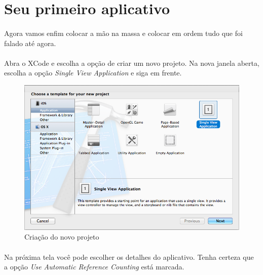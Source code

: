 \documentclass[a4paper,12pt,brazil,doubleside]{book}
\begin{document}
\bigskip
\bigskip


\section{Seu primeiro aplicativo}

\paragraph{}Agora vamos enfim colocar a mão na massa e colocar em ordem tudo que foi falado até agora.
\paragraph{}Abra o XCode e escolha a opção de criar um novo projeto. Na nova janela aberta, escolha a opção \emph{Single View Application} e siga em frente.

\begin{figure}[h]
  \centering
  \includegraphics[totalheight=0.3\textheight]{../figuras/ios/1/novo_projeto1.png}
  \caption{Criação do novo projeto}
  \label{fig:a}
\end{figure}

\bigskip

\paragraph{}Na próxima tela você pode escolher os detalhes do aplicativo. Tenha certeza que a opção \emph{Use Automatic Reference Counting} está marcada.
\end{document}
